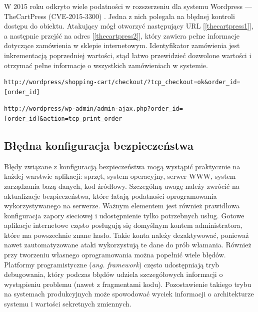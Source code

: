 \documentclass[11pt,a4paper,polish,thesis,oneside]{dcsbook}
\begin{document}
W 2015 roku odkryto wiele podatności w rozszerzeniu dla systemu Wordpress --- TheCartPress (CVE-2015-3300) \cite{thecartpress}. Jedna z nich polegała na błędnej kontroli dostępu do obiektu. Atakujący mógł otworzyć następujący URL [\ref{thecartpress1}], a następnie przejść na adres [\ref{thecartpress2}], który zawiera pełne informacje dotyczące zamówienia w sklepie internetowym. Identyfikator zamówienia jest inkrementacją poprzedniej wartości, stąd łatwo przewidzieć dozwolone wartości i otrzymać pełne informacje o wszystkich zamówieniach w systemie.

\begin{lstlisting}[caption=adres URL zamówienia w systemie TheCartPress,label=thecartpress1]
http://wordpress/shopping-cart/checkout/?tcp_checkout=ok&order_id=[order_id]
\end{lstlisting}

\begin{lstlisting}[caption=adres URL przeznaczony dla administratora do podglądu zamówienia,label=thecartpress2]
http://wordpress/wp-admin/admin-ajax.php?order_id=[order_id]&action=tcp_print_order
\end{lstlisting}


\subsection{Błędna konfiguracja bezpieczeństwa}
Błędy związane z konfiguracją bezpieczeństwa mogą wystąpić praktycznie na każdej warstwie aplikacji: sprzęt, system operacyjny, serwer WWW, system zarządzania bazą danych, kod źródłowy. Szczególną uwagę należy zwrócić na aktualizacje bezpieczeństwa, które łatają podatności oprogramowania wykorzystywanego na serwerze. Ważnym elementem jest również prawidłowa konfiguracja zapory sieciowej i udostępnienie tylko potrzebnych usług. Gotowe aplikacje internetowe często posługują się domyślnym kontem administratora, które ma powszechnie znane hasło. Takie konta należy dezaktywować, ponieważ nawet zautomatyzowane ataki wykorzystują te dane do prób włamania. Również przy tworzeniu własnego oprogramowania można popełnić wiele błędów. Platformy programistyczne (\textit{ang. framework}) często udostępniają tryb debugowania, który podczas błędów udziela szczegółowych informacji o wystąpieniu problemu (nawet z fragmentami kodu). Pozostawienie takiego trybu na systemach produkcyjnych może spowodować wyciek informacji o architekturze systemu i wartości sekretnych zmiennych.
\end{document}
